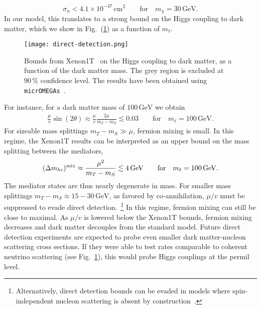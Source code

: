 \documentclass[nofootinbib,prd,aps,superscriptaddress,preprintnumbers]{revtex4}
\def\beq{\begin{equation}}
\def\eeq{\end{equation}}
\begin{document}
\beq
\sigma_n < 4.1\times 10^{-47}\,\text{cm}^2\qquad \text{for}\quad m_{\chi} = 30\,\text{GeV}.
\eeq
In our model, this translates to a strong bound on the Higgs coupling to dark matter, which we show in Fig.~(\ref{fig:direct-detection}) as a function of $m_\ell$.
\begin{figure}[!t]
\centering
\texttt{[image: direct-detection.png]} \hspace*{0.5cm}
\caption{\label{fig:direct-detection} Bounds from Xenon1T~\cite{Aprile:2018dbl} on the Higgs coupling to dark matter, as a function of the dark matter mass. The grey region is excluded at $90\,\%$ confidence level. The results have been obtained using \texttt{micrOMEGAs}~\cite{Belanger:2018mqt}.}
\end{figure}
 For instance, for a dark matter mass of $100\,\text{GeV}$ we obtain
\begin{align}
\frac{\mu}{v}\sin(2\theta) \approx \frac{\mu}{v}\frac{2\mu}{m_T - m_S} \lesssim 0.03\qquad \text{for}\quad m_{\ell} = 100\,\text{GeV}.
\end{align}
For sizeable mass splittings $m_T - m_S \gg \mu$, fermion mixing is small. In this regime, the Xenon1T results can be interpreted as an upper bound on the mass splitting between the mediators,
\begin{align}
(\Delta m_{hc})^{\rm mix} \approx \frac{\mu^2}{m_T - m_S} \lesssim 4\,\text{GeV} \qquad \text{for}\quad m_\ell = 100\,\text{GeV}.
\end{align}
The mediator states are thus nearly degenerate in mass. For smaller mass splittings $m_T - m_S \approx 15-30\,\text{GeV}$, as favored by co-annihilation, $\mu/v$ must be suppressed to evade direct detection.~\footnote{Alternatively, direct detection bounds can be evaded in models where spin-independent nucleon scattering is absent by construction~\cite{Gross:2017dan}.} In this regime, fermion mixing can still be close to maximal. As $\mu/v$ is lowered below the Xenon1T bounds, fermion mixing decreases and dark matter decouples from the standard model. Future direct detection experiments are expected to probe even smaller dark matter-nucleon scattering cross sections. If they were able to test rates comparable to coherent neutrino scattering (see Fig.~\ref{fig:direct-detection}), this would probe Higgs couplings at the permil level.

\end{document}
